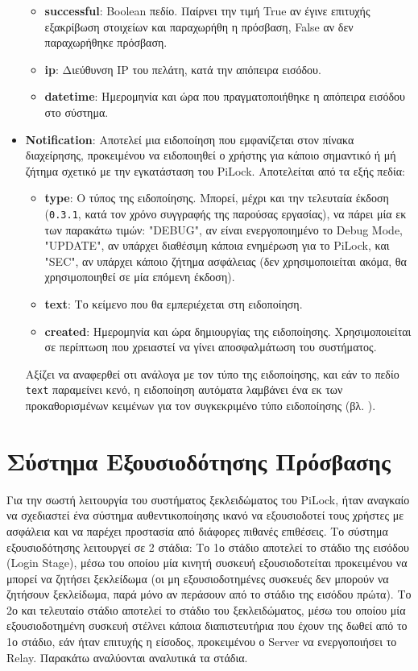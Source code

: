 \begin{itemize}
\begin{itemize}
			\item \textbf{successful}: Boolean πεδίο. Παίρνει την τιμή True αν έγινε επιτυχής εξακρίβωση στοιχείων και παραχωρήθη η πρόσβαση, False αν δεν παραχωρήθηκε πρόσβαση.
			\item \textbf{ip}: Διεύθυνση IP του πελάτη, κατά την απόπειρα εισόδου.
			\item \textbf{datetime}: Ημερομηνία και ώρα που πραγματοποιήθηκε η απόπειρα εισόδου στο σύστημα.
		\end{itemize}
		\item \textbf{Notification}: Αποτελεί μια ειδοποίηση που εμφανίζεται στον πίνακα διαχείρησης, προκειμένου να ειδοποιηθεί ο χρήστης για κάποιο σημαντικό ή μή ζήτημα σχετικό με την εγκατάσταση του PiLock. Αποτελείται από τα εξής πεδία:
		\begin{itemize}
			\item \textbf{type}: Ο τύπος της ειδοποίησης. Μπορεί, μέχρι και την τελευταία έκδοση (\verb|0.3.1|, κατά τον χρόνο συγγραφής της παρούσας εργασίας), να πάρει μία εκ των παρακάτω τιμών: "DEBUG", αν είναι ενεργοποιημένο το Debug Mode, "UPDATE", αν υπάρχει διαθέσιμη κάποια ενημέρωση για το PiLock, και "SEC", αν υπάρχει κάποιο ζήτημα ασφάλειας (δεν χρησιμοποιείται ακόμα, θα χρησιμοποιηθεί σε μία επόμενη έκδοση).
			\item \textbf{text}: Το κείμενο που θα εμπεριέχεται στη ειδοποίηση.
			\item \textbf{created}: Ημερομηνία και ώρα δημιουργίας της ειδοποίησης. Χρησιμοποιείται σε περίπτωση που χρειαστεί να γίνει αποσφαλμάτωση του συστήματος. 
		\end{itemize}
		Αξίζει να αναφερθεί οτι ανάλογα με τον τύπο της ειδοποίησης, και εάν το πεδίο \verb|text| παραμείνει κενό, η ειδοποίηση αυτόματα λαμβάνει ένα εκ των προκαθορισμένων κειμένων για τον συγκεκριμένο τύπο ειδοποίησης (βλ. ).
	\end{itemize}

\section{Σύστημα Εξουσιοδότησης Πρόσβασης}
	Για την σωστή λειτουργία του συστήματος ξεκλειδώματος του PiLock, ήταν αναγκαίο να σχεδιαστεί ένα σύστημα αυθεντικοποίησης ικανό να εξουσιοδοτεί τους χρήστες με ασφάλεια και να παρέχει προστασία από διάφορες πιθανές επιθέσεις. Το σύστημα εξουσιοδότησης λειτουργεί σε 2 στάδια: Το 1ο στάδιο αποτελεί το στάδιο της εισόδου (Login Stage), μέσω του οποίου μία κινητή συσκευή εξουσιοδοτείται προκειμένου να μπορεί να ζητήσει ξεκλείδωμα (οι μη εξουσιοδοτημένες συσκευές δεν μπορούν να ζητήσουν ξεκλείδωμα, παρά μόνο αν περάσουν από το στάδιο της εισόδου πρώτα). Το 2ο και τελευταίο στάδιο αποτελεί το στάδιο του ξεκλειδώματος, μέσω του οποίου μία εξουσιοδοτημένη συσκευή στέλνει κάποια διαπιστευτήρια που έχουν της δωθεί από το 1ο στάδιο, εάν ήταν επιτυχής η είσοδος, προκειμένου ο Server να ενεργοποιήσει το Relay. Παρακάτω αναλύονται αναλυτικά τα στάδια.


